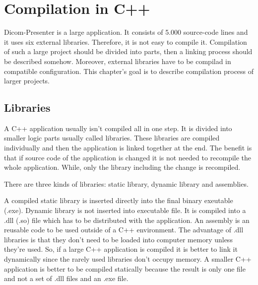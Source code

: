\chapter*{Compilation in C++}

Dicom-Presenter is a large application. It consists of 5.000 source-code lines and it uses six external libraries. Therefore, it is not easy to compile it. Compilation of such a large project should be divided into parts, then a linking process should be described somehow. Moreover, external libraries have to be compilad in compatible configuration. This chapter's goal is to describe compilation process of larger projects.

\section*{Libraries}

A C++ application usually isn't compiled all in one step. It is divided into smaller logic parts usually called libraries. These libraries are compiled individually and then the application is linked together at the end. The benefit is that if source code of the application is changed it is not needed to recompile the whole application. While, only the library including the change is recompiled. 

There are three kinds of libraries: static library, dynamic library and assemblies.

A compiled static library is inserted directly into the final binary exeutable (.exe). Dynamic library is not inserted into executable file. It is compiled into a .dll (.so) file which has to be distributed with the application. An assembly is an reusable code to be used outside of a C++ environment. The advantage of .dll libraries is that they don't need to be loaded into computer memory unless they're used. So, if a large C++ application is compiled it is better to link it dynamically since the rarely used libraries don't occupy memory. A smaller C++ application is better to be compiled statically because the result is only one file and not a set of .dll files and an .exe file.




